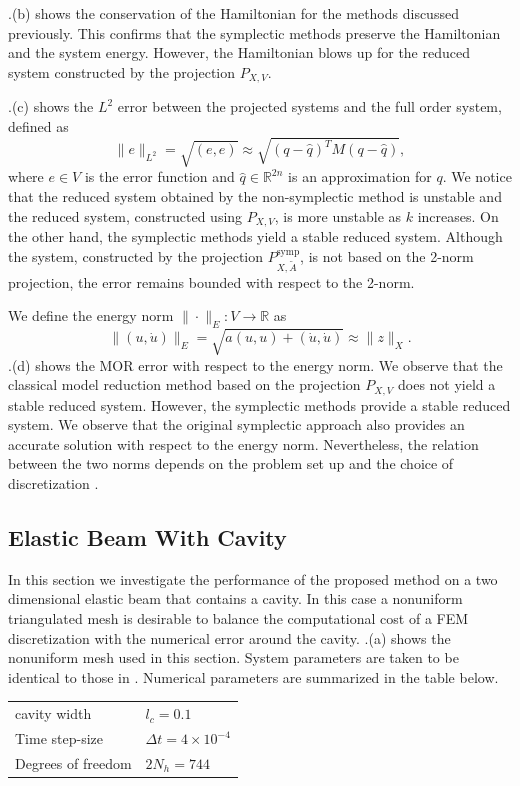.(b) shows the conservation of the Hamiltonian for the methods discussed previously. This confirms that the symplectic methods preserve the Hamiltonian and the system energy. However, the Hamiltonian blows up for the reduced system constructed by the projection $P_{X,V}$.

.(c) shows the $L^2$ error between the projected systems and the full order system, defined as
\begin{equation}
	\| e \|_{L^2} = \sqrt{(e,e)} \approx \sqrt{ (q - \hat q)^T M (q-\hat q) },
\end{equation}
where $e\in V$ is the error function and $\hat q \in \mathbb R^{2n}$ is an approximation for $q$. We notice that the reduced system obtained by the non-symplectic method is unstable and the reduced system, constructed using $P_{X,V}$, is more unstable as $k$ increases. On the other hand, the symplectic methods yield a stable reduced system. Although the system, constructed by the projection $P^{\text{symp}}_{X,\tilde A}$, is not based on the 2-norm projection, the error remains bounded with respect to the 2-norm. 

We define the energy norm $\| \cdot \|_E : V \to \mathbb R$ as
\begin{equation}
	\| (u,\dot u) \|_E = \sqrt{ a(u,u) + (\dot u , \dot u) } \approx \| z \|_X.
\end{equation}
.(d) shows the MOR error with respect to the energy norm. We observe that the classical model reduction method based on the projection $P_{X,V}$ does not yield a stable reduced system. However, the symplectic methods provide a stable reduced system. We observe that the original symplectic approach also provides an accurate solution with respect to the energy norm. Nevertheless, the relation between the two norms depends on the problem set up and the choice of discretization \cite{DEPARIS20094359}.

\subsection{Elastic Beam With Cavity}  \label{sec:res.1.1}
In this section we investigate the performance of the proposed method on a two dimensional elastic beam that contains a cavity. In this case a nonuniform triangulated mesh is desirable to balance the computational cost of a FEM discretization with the numerical error around the cavity. .(a) shows the nonuniform mesh used in this section.
System parameters are taken to be identical to those in . Numerical parameters are summarized in the table below.
\vspace{0.5cm}
\begin{center}
\begin{tabular}{|l|l|}
\hline
cavity width & $l_c = 0.1$ \\
Time step-size & $\Delta t = 4\times 10^{-4}$ \\
Degrees of freedom & $2N_{h} = 744$ \\
\hline
\end{tabular}
\end{center}
\vspace{0.5cm}


